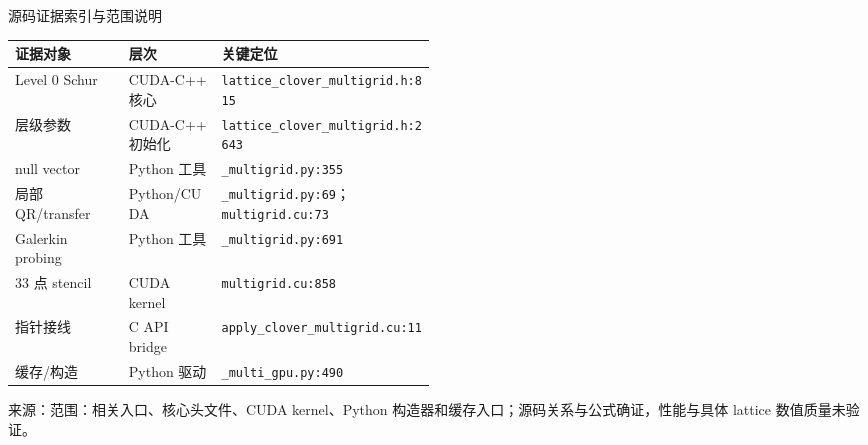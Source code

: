 \documentclass[UTF8,aspectratio=169,11pt]{ctexbeamer}
\newcommand{\source}[1]{%
  \vspace{-0.08em}\par{\raggedright\scriptsize\color{muted}来源：#1\par}}
\newcommand{\src}[1]{\nolinkurl{#1}}
\newcommand{\verified}{\textcolor{evidence}{确证}}
\newcommand{\unverified}{\textcolor{warning}{未验证}}
\begin{document}
\begin{frame}[t]{源码证据索引与范围说明}
  \begin{tabularx}{0.96\textwidth}{@{}P{0.27\linewidth}P{0.22\linewidth}Y@{}}
    \toprule
    证据对象 & 层次 & 关键定位 \\
    \midrule
    Level 0 Schur & CUDA-C++ 核心 & \src{lattice_clover_multigrid.h:815} \\
    层级参数 & CUDA-C++ 初始化 & \src{lattice_clover_multigrid.h:2643} \\
    null vector & Python 工具 & \src{_multigrid.py:355} \\
    局部 QR/transfer & Python/CUDA & \src{_multigrid.py:69}；\src{multigrid.cu:73} \\
    Galerkin probing & Python 工具 & \src{_multigrid.py:691} \\
    33 点 stencil & CUDA kernel & \src{multigrid.cu:858} \\
    指针接线 & C API bridge & \src{apply_clover_multigrid.cu:11} \\
    缓存/构造 & Python 驱动 & \src{_multi_gpu.py:490} \\
    \bottomrule
  \end{tabularx}
  \source{范围：相关入口、核心头文件、CUDA kernel、Python 构造器和缓存入口；源码关系与公式\verified{}，性能与具体 lattice 数值质量\unverified{}。}
\end{frame}
\end{document}
